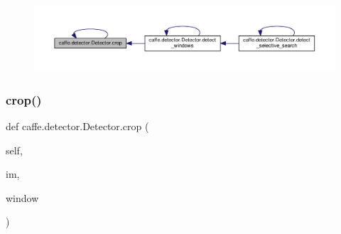 \nopagebreak
\begin{figure}[H]
\begin{center}
\leavevmode
\includegraphics[width=350pt]{classcaffe_1_1detector_1_1_detector_af71bb7e173a228c2e1577b9125310216_icgraph}
\end{center}
\end{figure}
\mbox{\label{classcaffe_1_1detector_1_1_detector_af71bb7e173a228c2e1577b9125310216}} 
\subsubsection{\texorpdfstring{crop()}{crop()}\hspace{0.1cm}{\footnotesize\ttfamily [2/2]}}
{\footnotesize\ttfamily def caffe.\+detector.\+Detector.\+crop (\begin{DoxyParamCaption}\item[{}]{self,  }\item[{}]{im,  }\item[{}]{window }\end{DoxyParamCaption})}

